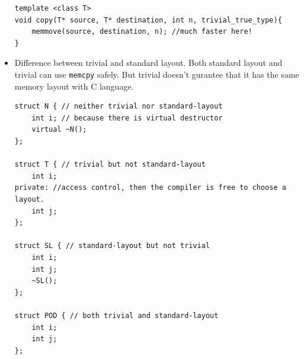 \documentclass[a4paper,11pt,twoside]{book}
\begin{document}
\begin{itemize}
\begin{lstlisting}[numbers=none]
template <class T> 
void copy(T* source, T* destination, int n, trivial_true_type){
	memmove(source, destination, n); //much faster here!
}
\end{lstlisting}

\item Difference between trivial and standard layout. Both standard layout and trivial can use \texttt{memcpy} safely. But trivial doesn't gurantee that it has the same memory layout with C language.
\begin{lstlisting}[numbers=none]
struct N { // neither trivial nor standard-layout
	int i; // because there is virtual destructor
	virtual ~N();
};

struct T { // trivial but not standard-layout
	int i;
private: //access control, then the compiler is free to choose a layout.
	int j;
};

struct SL { // standard-layout but not trivial
	int i;
	int j;
	~SL();
};

struct POD { // both trivial and standard-layout
	int i;
	int j;
};
\end{lstlisting}	

\end{itemize}
\end{document}

